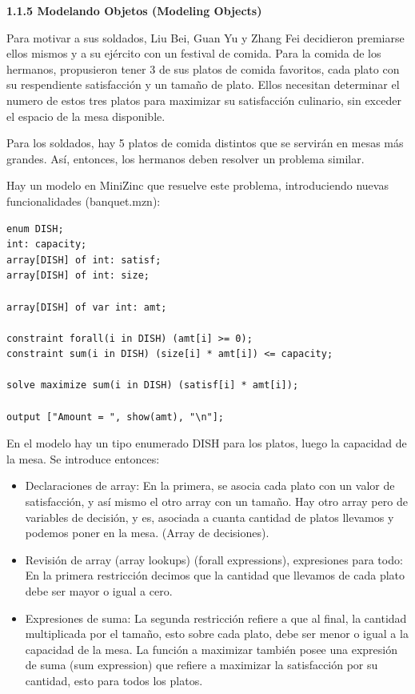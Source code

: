 \documentclass[12pt]{article}
\begin{document}
\newpage

\textbf{1.1.5 Modelando Objetos (Modeling Objects)}

\begin{justify}
Para motivar a sus soldados, Liu Bei, Guan Yu y Zhang Fei decidieron premiarse ellos mismos y a su ejército con un festival de comida. Para la comida de los hermanos, propusieron tener 3 de sus platos de comida favoritos, cada plato con su respendiente satisfacción y un tamaño de plato. Ellos necesitan determinar el numero de estos tres platos para maximizar su satisfacción culinario, sin exceder el espacio de la mesa disponible.
\end{justify}

\begin{justify}
Para los soldados, hay 5 platos de comida distintos que se servirán en mesas más grandes. Así, entonces, los hermanos deben resolver un problema similar.
\end{justify}

\begin{justify}
Hay un modelo en MiniZinc que resuelve este problema, introduciendo nuevas funcionalidades (banquet.mzn):
\end{justify}

\begin{Verbatim}
enum DISH;
int: capacity;
array[DISH] of int: satisf;
array[DISH] of int: size;

array[DISH] of var int: amt; 

constraint forall(i in DISH) (amt[i] >= 0);
constraint sum(i in DISH) (size[i] * amt[i]) <= capacity;

solve maximize sum(i in DISH) (satisf[i] * amt[i]);

output ["Amount = ", show(amt), "\n"];
\end{Verbatim}

\begin{justify}
En el modelo hay un tipo enumerado DISH para los platos, luego la capacidad de la mesa. Se introduce entonces:
\end{justify}

\begin{itemize}
\item Declaraciones de array: En la primera, se asocia cada plato con un valor de satisfacción, y así mismo el otro array con un tamaño. Hay otro array pero de variables de decisión, y es, asociada a cuanta cantidad de platos llevamos y podemos poner en la mesa. (Array de decisiones). 
\item Revisión de array (array lookups) (forall expressions), expresiones para todo: En la primera restricción decimos que la cantidad que llevamos de cada plato debe ser mayor o igual a cero.
\item Expresiones de suma: La segunda restricción refiere a que al final, la cantidad multiplicada por el tamaño, esto sobre cada plato, debe ser menor o igual a la capacidad de la mesa. La función a maximizar también posee una expresión de suma (sum expression) que refiere a maximizar la satisfacción por su cantidad, esto para todos los platos.
\end{itemize}
\end{document}

